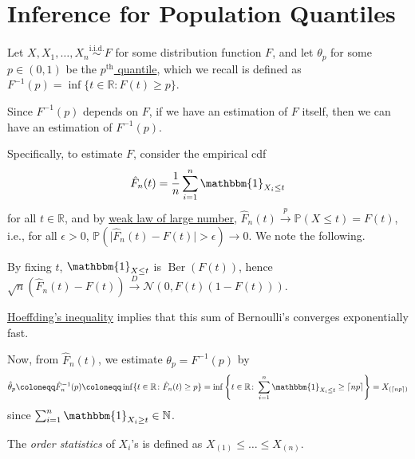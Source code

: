 \section{Inference for Population Quantiles}
Let \(X, X_1, \dots , X_n \overset{\text{i.i.d.} }{\sim } F\) for some distribution function \(F\), and let \(\theta _p\) for some \(p \in (0, 1)\) be the \hyperref[def:quantile-function]{\(p^{\text{th} }\) quantile}, which we recall is defined as \(F^{-1} (p) = \inf \{ t \in \mathbb{R} \colon F(t) \geq p \} \).

\begin{intuition}
	Since \(F^{-1} (p)\) depends on \(F\), if we have an estimation of \(F\) itself, then we can have an estimation of \(F^{-1} (p)\).
\end{intuition}

Specifically, to estimate \(F\), consider the empirical cdf
\[
	\hat{F} _n(t) = \frac{1}{n} \sum_{i=1}^{n} \mathbbm{1}_{X_i \leq t}
\]
for all \(t \in \mathbb{R} \), and by \hyperref[thm:WLLN]{weak law of large number}, \(\hat{F} _n(t) \overset{p}{\to} \mathbb{P} (X \leq t) = F(t)\), i.e., for all \(\epsilon > 0\), \(\mathbb{P} (\vert \hat{F} _n(t) - F(t) \vert > \epsilon ) \to 0\). We note the following.

\begin{note}
	By fixing \(t\), \(\mathbbm{1}_{X \leq t} \) is \(\operatorname{Ber}(F(t)) \), hence \(\sqrt{n} (\hat{F} _n(t) - F(t)) \overset{D}{\to} \mathcal{N} (0, F(t) (1 - F(t)))\).
\end{note}

\begin{note}
	\href{https://en.wikipedia.org/wiki/Hoeffding%27s_inequality}{Hoeffding's inequality} implies that this sum of Bernoulli's converges exponentially fast.
\end{note}

Now, from \(\hat{F} _n(t)\), we estimate \(\theta _p = F^{-1} (p)\) by
\[
	\hat{\theta} _p
	\coloneqq \hat{F} _n ^{-1} (p)
	\coloneqq \inf \{ t \in \mathbb{R} \colon \hat{F} _n(t) \geq p \}
	= \inf \left\{ t \in \mathbb{R} \colon \sum_{i=1}^{n} \mathbbm{1}_{X_i \leq t} \geq \lceil np \rceil \right\}
	= X_{(\lceil np \rceil )}
\]
since \(\sum_{i=1}^{n} \mathbbm{1}_{X_i \geq t} \in \mathbb{N} \).

\begin{notation}
	The \emph{order statistics} of \(X_i\)'s is defined as \(X_{(1)} \leq \dots \leq X_{(n)}\).
\end{notation}

